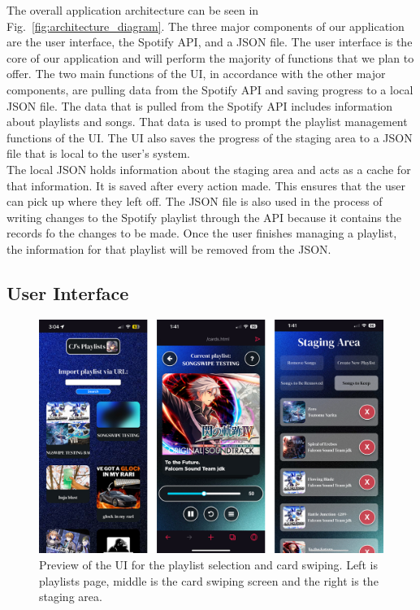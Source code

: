 \documentclass{article}
\begin{document}
\quad The overall application architecture can be seen in Fig.~\ref{fig:architecture_diagram}. The three major components of our application are the user interface, the Spotify API, and a JSON file. The user interface is the core of our application and will perform the majority of functions that we plan to offer. The two main functions of the UI, in accordance with the other major components, are pulling data from the Spotify API and saving progress to a local JSON file. The data that is pulled from the Spotify API includes information about playlists and songs. That data is used to prompt the playlist management functions of the UI. The UI also saves the progress of the staging area to a JSON file that is local to the user’s system.\\

\quad The local JSON holds information about the staging area and acts as a cache for that information. It is saved after every action made. This ensures that the user can pick up where they left off. The JSON file is also used in the process of writing changes to the Spotify playlist through the API because it contains the records fo the changes to be made. Once the user finishes managing a playlist, the information for that playlist will be removed from the JSON.

\subsection{User Interface}
\begin{figure}[ht]
  \centering
  \captionsetup{justification=centering}
  \includegraphics[width=6in,scale=5]{./ui-final.png}
  \caption{Preview of the UI for the playlist selection and card swiping. Left is playlists page, middle is the card swiping screen and the right is the staging area. }
  \label{fig:ui_preview}
\end{figure}
\end{document}
